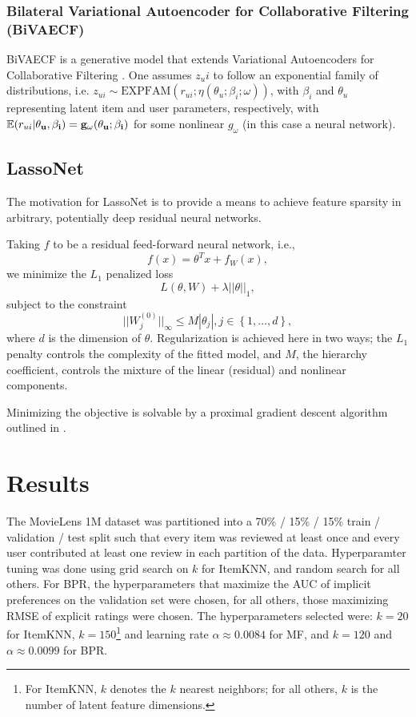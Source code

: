 \documentclass{article}
\begin{document}
\subsubsection{Bilateral Variational Autoencoder for Collaborative
  Filtering (BiVAECF)}

BiVAECF is a generative model that extends Variational Autoencoders for
Collaborative Filtering \cite{liang2018variational}.  One assumes $z_ui$
to follow an exponential family of distributions, i.e. $z_{ui} \sim
  \textrm{EXPFAM}(r_{ui};\eta(\theta_u;\beta_i;\omega))$, with $\beta_i$ and
$\theta_u$ representing latent item and user parameters, respectively,
with $\mathbb{E}(r_{ui}|\bf{\theta}_u,\bf{\beta}_i) =
  g_{\omega}(\bf{\theta}_u;\bf{\beta}_i)$ for some nonlinear $g_{\omega}$
(in this case a neural network).

\subsection{LassoNet}

The motivation for LassoNet is to provide a means to achieve feature
sparsity in arbitrary, potentially deep residual neural networks.

Taking $f$ to be a residual feed-forward neural network, i.e.,
$$f(x) = \theta^Tx + f_W(x),$$ we minimize the $L_1$ penalized loss
$$L(\theta, W) + \lambda||\theta||_1,$$ subject to the constraint
$$||W^{(0)}_j||_\infty \leq M|\theta_j|, j \in \left\{1, \ldots, d\right\},$$
where $d$ is the dimension of $\theta$.  Regularization is achieved here in
two ways; the $L_1$ penalty controls the complexity of the fitted model,
and $M$, the hierarchy coefficient, controls the mixture of the
linear (residual) and nonlinear components.

Minimizing the objective is solvable by a proximal gradient descent algorithm
outlined in \cite{lemhadri_lassonet_2021}.

\section{Results}

The MovieLens 1M dataset was partitioned into a 70\% / 15\% / 15\% train
/ validation / test split such that every item was reviewed at least once and
every user contributed at least one review in each partition of the data.
Hyperparamter tuning was done using grid search on $k$ for ItemKNN, and
random search for all others.  For BPR, the hyperparameters that
maximize the AUC of implicit preferences on the validation set were
chosen, for all others, those maximizing RMSE of explicit ratings were
chosen.  The hyperparameters selected were: $k=20$ for ItemKNN,
$k=150$\footnote{For ItemKNN, $k$ denotes the $k$ nearest neighbors; for
  all others, $k$ is the number of latent feature dimensions.} and
learning rate $\alpha \approx 0.0084$ for MF, and $k=120$ and $\alpha
  \approx 0.0099$ for BPR.
\end{document}
